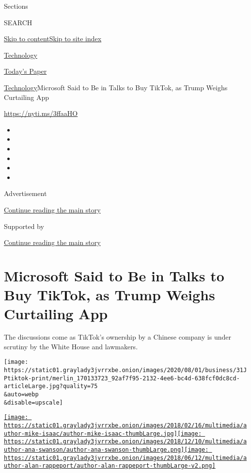 Sections

SEARCH

\protect\hyperlink{site-content}{Skip to
content}\protect\hyperlink{site-index}{Skip to site index}

\href{https://www.nytimes3xbfgragh.onion/section/technology}{Technology}

\href{https://myaccount.nytimes3xbfgragh.onion/auth/login?response_type=cookie\&client_id=vi}{}

\href{https://www.nytimes3xbfgragh.onion/section/todayspaper}{Today's
Paper}

\href{/section/technology}{Technology}\textbar{}Microsoft Said to Be in
Talks to Buy TikTok, as Trump Weighs Curtailing App

\href{https://nyti.ms/3ffaaHO}{https://nyti.ms/3ffaaHO}

\begin{itemize}
\item
\item
\item
\item
\item
\item
\end{itemize}

Advertisement

\protect\hyperlink{after-top}{Continue reading the main story}

Supported by

\protect\hyperlink{after-sponsor}{Continue reading the main story}

\hypertarget{microsoft-said-to-be-in-talks-to-buy-tiktok-as-trump-weighs-curtailing-app}{%
\section{Microsoft Said to Be in Talks to Buy TikTok, as Trump Weighs
Curtailing
App}\label{microsoft-said-to-be-in-talks-to-buy-tiktok-as-trump-weighs-curtailing-app}}

The discussions come as TikTok's ownership by a Chinese company is under
scrutiny by the White House and lawmakers.

\texttt{[image: https://static01.graylady3jvrrxbe.onion/images/2020/08/01/business/31JPtiktok-print/merlin\_170133723\_92af7f95-2132-4ee6-bc4d-638fcf0dc8cd-articleLarge.jpg?quality=75\\\&auto=webp\\\&disable=upscale]}

\href{https://www.nytimes3xbfgragh.onion/by/mike-isaac}{\texttt{[image: https://static01.graylady3jvrrxbe.onion/images/2018/02/16/multimedia/author-mike-isaac/author-mike-isaac-thumbLarge.jpg]}}\href{https://www.nytimes3xbfgragh.onion/by/ana-swanson}{\texttt{[image: https://static01.graylady3jvrrxbe.onion/images/2018/12/10/multimedia/author-ana-swanson/author-ana-swanson-thumbLarge.png]}}\href{https://www.nytimes3xbfgragh.onion/by/alan-rappeport}{\texttt{[image: https://static01.graylady3jvrrxbe.onion/images/2018/06/12/multimedia/author-alan-rappeport/author-alan-rappeport-thumbLarge-v2.png]}}

